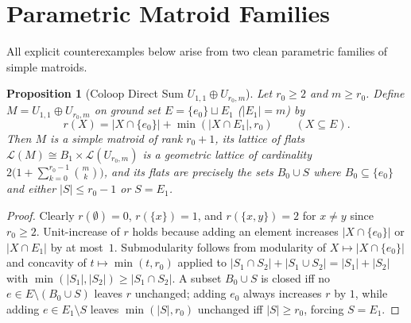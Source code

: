 \documentclass[11pt]{article}
\newtheorem{proposition}[theorem]{Proposition}
\theoremstyle{definition}
\theoremstyle{remark}
\begin{document}
\section{Parametric Matroid Families}

All explicit counterexamples below arise from two clean parametric families of simple matroids.

\begin{proposition}[Coloop Direct Sum $U_{1,1} \oplus U_{r_0, m}$]\label{prop:direct-sum-coloop}
Let $r_0 \ge 2$ and $m \ge r_0$. Define $M = U_{1,1} \oplus U_{r_0, m}$ on ground set $E = \{e_0\} \sqcup E_1$ ($|E_1| = m$) by
\[
  r(X) = |X \cap \{e_0\}| + \min(|X \cap E_1|, r_0) \qquad (X \subseteq E).
\]
Then $M$ is a simple matroid of rank $r_0 + 1$, its lattice of flats $\mathcal{L}(M) \cong B_1 \times \mathcal{L}(U_{r_0, m})$ is a geometric lattice of cardinality $2\bigl(1 + \sum_{k=0}^{r_0 - 1} \binom{m}{k}\bigr)$, and its flats are precisely the sets $B_0 \cup S$ where $B_0 \subseteq \{e_0\}$ and either $|S| \le r_0 - 1$ or $S = E_1$.
\end{proposition}
\begin{proof}
Clearly $r(\emptyset) = 0$, $r(\{x\}) = 1$, and $r(\{x, y\}) = 2$ for $x \ne y$ since $r_0 \ge 2$. Unit-increase of $r$ holds because adding an element increases $|X \cap \{e_0\}|$ or $|X \cap E_1|$ by at most~$1$. Submodularity follows from modularity of $X \mapsto |X \cap \{e_0\}|$ and concavity of $t \mapsto \min(t, r_0)$ applied to $|S_1 \cap S_2| + |S_1 \cup S_2| = |S_1| + |S_2|$ with $\min(|S_1|,|S_2|) \ge |S_1 \cap S_2|$. A subset $B_0 \cup S$ is closed iff no $e \in E \setminus (B_0 \cup S)$ leaves $r$ unchanged; adding $e_0$ always increases $r$ by $1$, while adding $e \in E_1 \setminus S$ leaves $\min(|S|, r_0)$ unchanged iff $|S| \ge r_0$, forcing $S = E_1$.
\end{proof}
\end{document}
